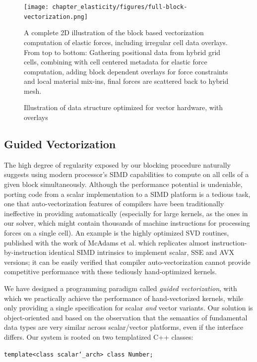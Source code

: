 \begin{figure}[t]
   \texttt{[image: chapter\_elasticity/figures/full-block-vectorization.png]}
   \vspace*{-.3in}
   \caption{Illustration of data structure optimized for vector
     hardware, with overlays}{A complete 2D illustration of the block
     based vectorization computation of elastic forces, including
     irregular cell data overlays. From top to bottom: Gathering
     positional data from hybrid grid cells, combining with cell
     centered metadata for elastic force computation, adding block
     dependent overlays for force constraints and local material
     mix-ins, final forces are scattered back to hybrid mesh.}
   \label{fig:full-block-vectorization}
   \vspace*{-.15in}
\end{figure}


\subsection{Guided Vectorization}

The high degree of regularity exposed by our blocking procedure
naturally suggests using modern processor's SIMD capabilities to
compute on all cells of a given block simultaneously. Although the
performance potential is undeniable, porting code from a scalar
implementation to a SIMD platform is a tedious task, one that
auto-vectorization features of compilers have been traditionally
ineffective in providing automatically (especially for
large kernels, as the ones in our solver, which might contain
thousands of machine instructions for processing forces on a
single cell). An example is the highly optimized SVD routines,
published with the work of McAdams et al.\!
 which replicates almost
instruction-by-instruction identical SIMD intrinsics to implement
scalar, SSE and AVX versions; it can be easily verified that
compiler auto-vectorization cannot provide competitive performance
with these tediously hand-optimized kernels.

We have designed a programming paradigm called \emph{guided
  vectorization}, with which we practically achieve the performance of
hand-vectorized kernels, while only providing a single specification
for scalar \emph{and} vector variants. Our solution is object-oriented
and based on the observation that the semantics of fundamental data
types are very similar across scalar/vector platforms, even if the
interface differs. Our system is rooted on two templatized C++
classes:
\begin{shaded}
\texttt{template<class scalar\char`_arch> class Number;}
\end{shaded}

